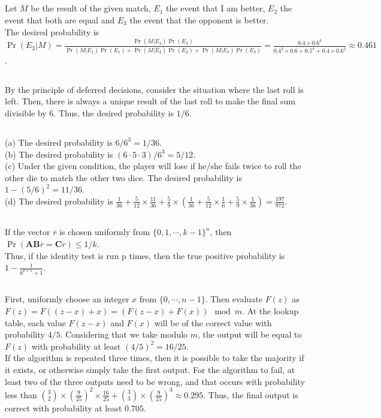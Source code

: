\documentclass{article}
\begin{document}
\subsection{}
Let $M$ be the result of the given match, $E_1$ the event that I am better, $E_2$ the event that both are equal and $E_3$ the event that the opponent is better.\\
The desired probability is $\Pr(E_3|M)=\frac{\Pr(M|E_3)\Pr(E_3)}{\Pr(M|E_1)\Pr(E_1)+\Pr(M|E_2)\Pr(E_2)+\Pr(M|E_3)\Pr(E_3)}=\frac{0.4\times0.6^3}{0.4^3\times0.6+0.5^4+0.4\times0.6^3}\approx0.461$.
\subsection{}
By the principle of deferred decisions, consider the situation where the last roll is left. Then, there is always a unique result of the last roll to make the final sum divisible by 6. Thus, the desired probability is $1/6$.
\subsection{}
(a) The desired probability is $6/6^3=1/36$.\\
(b) The desired probability is $(6\cdot5\cdot3)/6^3=5/12$.\\
(c) Under the given condition, the player will lose if he/she fails twice to roll the other die to match the other two dice. The desired probability is $1-(5/6)^2=11/36$.\\
(d) The desired probability is $\frac{1}{36}+\frac{5}{12}\times\frac{11}{36}+\frac{5}{9}\times(\frac{1}{36}+\frac{5}{12}\times\frac{1}{6}+\frac{5}{9}\times\frac{1}{36})=\frac{197}{972}$.
\subsection{}
If the vector $\overline{r}$ is chosen uniformly from $\{0,1,\cdots,k-1\}^n$, then\\
$\Pr(\textbf{AB}\overline{r}=\textbf{C}\overline{r})\leq 1/k$.\\
Thus, if the identity test is run p times, then the true positive probability is $1-\frac{1}{k^{p+1}+1}$.
\subsection{}
First, uniformly choose an integer $x$ from $\{0,\cdots,n-1\}$. Then evaluate $F(z)$ as $F(z)=F((z-x)+x)=(F(z-x)+F(x))\mod{m}$.
At the lookup table, each value $F(z-x)$ and $F(x)$ will be of the correct value with probability $4/5$.
Considering that we take modulo $m$, the output will be equal to $F(z)$ with probability at least $(4/5)^2=16/25$.\\
If the algorithm is repeated three times, then it is possible to take the majority if it exists, or otherwise simply take the first output.
For the algorithm to fail, at least two of the three outputs need to be wrong, and that occurs with probability less than $\binom{3}{2}\times(\frac{9}{25})^2\times\frac{16}{25}+\binom{3}{3}\times(\frac{9}{25})^3\approx0.295$.
Thus, the final output is correct with probability at least $0.705$.
\end{document}
